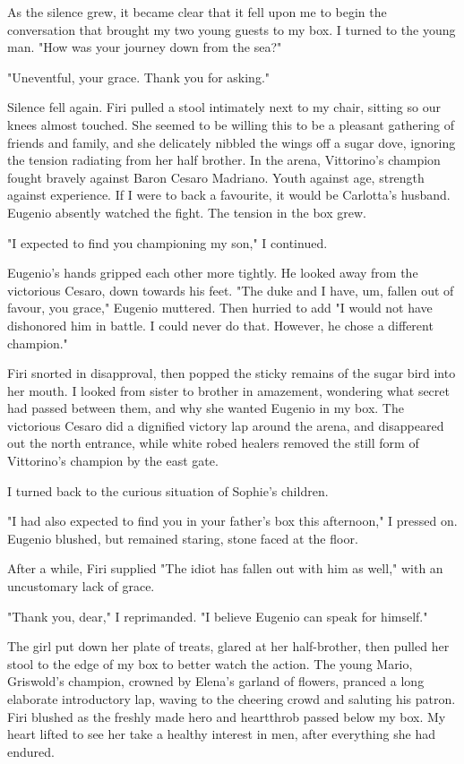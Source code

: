 \documentclass{article}
\begin{document}
As the silence grew, it became clear that it fell upon me to begin the conversation that brought my two young guests to my box. I turned to the young man. "How was your journey down from the sea?"

"Uneventful, your grace. Thank you for asking."

Silence fell again. Firi pulled a stool intimately next to my chair, sitting so our knees almost touched. She seemed to be willing this to be a pleasant gathering of friends and family, and she delicately nibbled the wings off a sugar dove, ignoring the tension radiating from her half brother. In the arena, Vittorino's champion fought bravely against Baron Cesaro Madriano. Youth against age, strength against experience. If I were to back a favourite, it would be Carlotta's husband. Eugenio absently watched the fight. The tension in the box grew.

"I expected to find you championing my son," I continued.

Eugenio's hands gripped each other more tightly. He looked away from the victorious Cesaro, down towards his feet. "The duke and I have, um, fallen out of favour, you grace," Eugenio muttered. Then hurried to add "I would not have dishonored him in battle. I could never do that. However, he chose a different champion."

Firi snorted in disapproval, then popped the sticky remains of the sugar bird into her mouth. I looked from sister to brother in amazement, wondering what secret had passed between them, and why she wanted Eugenio in my box. The victorious Cesaro did a dignified victory lap around the arena, and disappeared out the north entrance, while white robed healers removed the still form of Vittorino's champion by the east gate.

I turned back to the curious situation of Sophie's children.

"I had also expected to find you in your father's box this afternoon," I pressed on. Eugenio blushed, but remained staring, stone faced at the floor.

After a while, Firi supplied "The idiot has fallen out with him as well," with an uncustomary lack of grace.

"Thank you, dear," I reprimanded. "I believe Eugenio can speak for himself."

The girl put down her plate of treats, glared at her half-brother, then pulled her stool to the edge of my box to better watch the action. The young Mario, Griswold's champion, crowned by Elena's garland of flowers, pranced a long elaborate introductory lap, waving to the cheering crowd and saluting his patron. Firi blushed as the freshly made hero and heartthrob passed below my box. My heart lifted to see her take a healthy interest in men, after everything she had endured.
\end{document}
